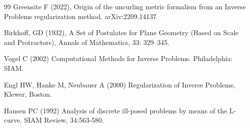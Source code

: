 \documentclass{amsart}
\numberwithin{equation}{section}
\theoremstyle{definition}
\numberwithin{theorem}{section}
\begin{document}
\begin{thebibliography}{99}
                     Greensite F (2022), Origin of the uncurling metric formalism from an Inverse Problems regularization method. arXiv:2209.14137

          Birkhoff, GD (1932), A Set of Postulates for Plane Geometry (Based on Scale and Protractors), Annals of Mathematics, 33: 329–345.
         
                Vogel C (2002) Computational Methods for Inverse Problems. Philadelphia: SIAM.
      
        Engl HW,  Hanke M,  Neubauer A (2000) Regularization of Inverse Problems, Klewer, Boston.
      
       Hansen PC (1992) Analysis of discrete ill-posed problems by means of the L-curve. SIAM Review, 34:563-580.
      
       
      \end{thebibliography}
  
 
   
\end{document}
